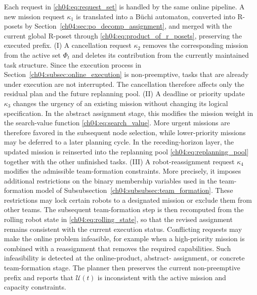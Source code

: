 Each request in \eqref{ch04:eq:request_set} is handled by the same online
pipeline. A new mission request $\kappa_1$ is translated into a B\"uchi
automaton, converted into R-posets by Section~\ref{ch04:sec:po_decomp_assignment},
and merged with the current global R-poset through
\eqref{ch04:eq:product_of_r_posets}, preserving the executed prefix.
(I) A cancellation request $\kappa_2$ removes the corresponding mission from the
active set $\Phi_t$ and deletes its contribution from the currently maintained
task structure. Since the execution process in
Section~\ref{ch04:subsec:online_execution} is non-preemptive, tasks that are
already under execution are not interrupted. The cancellation therefore affects
only the residual plan and the future replanning pool.
(II) A deadline or priority update $\kappa_3$ changes the urgency of an existing
mission without changing its logical specification. In the abstract assignment
stage, this modifies the mission weight in the search-value function
\eqref{ch04:eq:search_value}. More urgent missions are therefore favored in the
subsequent node selection, while lower-priority missions may be deferred to a
later planning cycle. In the receding-horizon layer, the updated mission is
reinserted into the replanning pool
\eqref{ch04:eq:replanning_pool} together with the other unfinished tasks.
(III) A robot-reassignment request $\kappa_4$ modifies the admissible team-formation
constraints. More precisely, it imposes additional restrictions on the binary
membership variables used in the team-formation model of
Subsubsection~\ref{ch04:subsubsec:team_formation}. These restrictions may lock
certain robots to a designated mission or exclude them from other teams. The
subsequent team-formation step is then recomputed from the rolling robot state
in \eqref{ch04:eq:rolling_state}, so that the revised assignment remains
consistent with the current execution status.
Conflicting requests may make the online problem infeasible, for example when a
high-priority mission is combined with a reassignment that removes the required
capabilities. Such infeasibility is detected at the online-product, abstract-
assignment, or concrete team-formation stage. The planner then preserves the
current non-preemptive prefix and reports that $\mathcal{U}(t)$ is inconsistent
with the active mission and capacity constraints.
